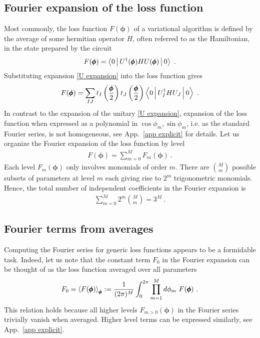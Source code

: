 \documentclass[twocolumn, amsfonts, amssymb, aps, nofootinbib]{revtex4-2}
\begin{document}
\subsection{Fourier expansion of the loss function}
Most commonly, the loss function $F(\pmb\phi)$ of a variational algorithm is defined by the average of some hermitian operator $H$, often referred to as the Hamiltonian, in the state prepared by the circuit 
\begin{align}
	F(\pmb{\phi})=\Braket{0|U^\dagger(\pmb\phi)HU(\pmb\phi)|0} \ . \label{F def}
\end{align}
Substituting expansion \eqref{U expansion} into the loss function gives
\begin{align}
	F(\pmb{\phi})=\sum_{IJ}t_I\left(\frac{\pmb \phi}{2}\right)t_J\left(\frac{\pmb \phi}{2}\right)\Braket{0|U^\dagger_IHU_J|0} \ . \label{F exp}
\end{align}
In contrast to the expansion of the unitary \eqref{U expansion}, expansion of the loss function when expressed as a polynomial in $\cos\phi_m,\sin\phi_m$, i.e. as the standard Fourier series, is not homogeneous, see App.~\ref{app explicit} for details. Let us organize the Fourier expansion of the loss function by level
\begin{align}
	F(\pmb\phi)=\sum_{m=0}^M F_m(\pmb\phi) \ . \label{Fm def}
\end{align}
Each level $F_m(\pmb\phi)$ only involves monomials of order $m$.
There are $\binom{M}{m}$ possible subsets of parameters at level $m$ each giving rise to $2^m$ trigonometric monomials. Hence, the total number of independent coefficients in the Fourier expansion is
\begin{align}
	\sum_{m=0}^M 2^{m}\binom{M}{m}=3^M \label{3M coeffs} \ .
\end{align}
\subsection{Fourier terms from averages}
Computing the Fourier series for generic loss functions appears to be a formidable task. Indeed, let us note that the constant term $F_0$ in the Fourier expansion can be thought of as the loss function averaged over all parameters
\begin{align}
	F_0=\Braket{F(\pmb\phi)}_{\pmb\phi}:=\frac{1}{(2\pi)^M}\int_0^{2\pi}\prod_{m=1}^Md\phi_m\,\, F(\pmb\phi) \ . \label{F avg}
\end{align}
This relation holds because all higher levels $F_{m>0}(\pmb\phi)$ in the Fourier series trivially vanish when averaged. Higher level terms can be expressed similarly, see App.~\ref{app explicit}.
\end{document}
